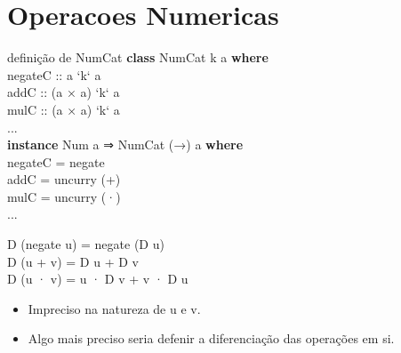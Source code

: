 \documentclass{beamer}
\begin{document}
\section{Operacoes Numericas}
\begin{frame}{definição de NumCat}
    \textbf{class} NumCat k a \textbf{where}\\
        \hspace{1cm}negateC :: a ‘k‘ a\\
        \hspace{1cm}addC :: (a × a) ‘k‘ a\\
        \hspace{1cm}mulC :: (a × a) ‘k‘ a\\
        \hspace{1cm}...\\
    \vspace{2mm} 
    \textbf{instance} Num a ⇒ NumCat (→) a \textbf{where}\\
        \hspace{1cm}negateC = negate\\
        \hspace{1cm}addC = uncurry (+)\\
        \hspace{1cm}mulC = uncurry (·)\\
        \hspace{1cm}...\\
\end{frame}
\begin{frame}
    D (negate u) = negate (D u)\\
    D (u + v) = D u + D v\\
    D (u · v) = u · D v + v · D u\\
    \begin{itemize}
        \item
            Impreciso na natureza de u e v.
        \item
            Algo mais preciso seria defenir a diferenciação das operações em si.
    \end{itemize}
\end{frame}
\end{document}
